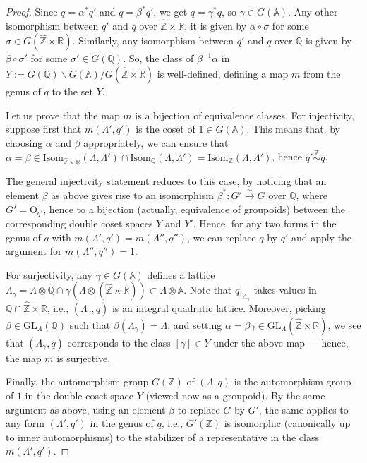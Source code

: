 \begin{proof}
	Since $q=\alpha^* q'$ and $q= \beta^* q'$, we get $q=\gamma^* q$, so $\gamma\in G(\mathbb{A})$. Any other isomorphism between $q'$ and $q$ over $\hat{\mathbb{Z}}\times \mathbb{R}$, it is given by $\alpha\circ \sigma$ for some $\sigma\in G(\hat{\mathbb{Z}}\times\mathbb{R})$. Similarly, any isomorphism between $q'$ and $q$ over $\mathbb{Q}$ is given by $\beta\circ \sigma'$ for some $\sigma'\in G(\mathbb{Q})$. So, the class of $\beta^{-1}\alpha$ in $Y:=G(\mathbb{Q})\backslash G(\mathbb{A})/G(\hat{\mathbb{Z}}\times \mathbb{R})$ is well-defined, defining a map $m$ from the genus of $q$ to the set $Y$.

    Let us prove that the map $m$ is a bijection of equivalence classes. For injectivity, suppose first that $m(\Lambda',q')$ is the coset of $1 \in G(\mathbb A)$. This means that, by choosing $\alpha$ and $\beta$ appropriately, we can ensure that $\alpha = \beta \in \text{Isom}_{\hat{\mathbb{Z}}\times\mathbb{R}} (\Lambda, \Lambda') \cap \text{Isom}_{\mathbb Q} (\Lambda, \Lambda') = \text{Isom}_{\mathbb{Z}}(\Lambda, \Lambda')$, hence $q' \overset{\mathbb Z}\sim q$. 
        
    The general injectivity statement reduces to this case, by noticing that an element $\beta$ as above gives rise to an isomorphism $\beta^*: G' \xrightarrow\sim G$ over $\mathbb Q$, where $G' = \text{O}_{q'}$, hence to a bijection (actually, equivalence of groupoids) between the corresponding double coset spaces $Y$ and $Y'$. Hence, for any two forms in the genus of $q$ with $m(\Lambda',q') = m(\Lambda'',q'')$, we can replace $q$ by $q'$ and apply the argument for $m(\Lambda'',q'')=1$.
	
    For surjectivity, any $\gamma \in G(\mathbb{A})$ defines a lattice $\Lambda_{\gamma}=\Lambda \otimes \mathbb{Q} \cap \gamma(\Lambda \otimes(\hat{\mathbb{Z}}\times \mathbb{R})) \subset \Lambda \otimes \mathbb{A}$. Note that $q|_{\Lambda_\gamma}$ takes values in $\mathbb Q\cap \hat{\mathbb{Z}}\times \mathbb{R}$, i.e., $(\Lambda_\gamma,q)$ is an integral quadratic lattice. Moreover, picking $\beta \in \text{GL}_{\Lambda}(\mathbb{Q})$ such that $\beta(\Lambda_\gamma)=\Lambda$, and setting $\alpha= \beta \gamma\in \text{GL}_{\Lambda}(\hat{\mathbb{Z}}\times \mathbb{R})$, we see that $(\Lambda_\gamma,q)$ corresponds to the class $[\gamma]\in Y$ under the above map --- hence, the map $m$ is surjective. 
	
	Finally, the automorphism group $G(\mathbb Z)$ of $(\Lambda,q)$ is the automorphism group of $1$ in the double coset space $Y$ (viewed now as a groupoid). By the same argument as above, using an element $\beta$ to replace $G$ by $G'$, the same applies to any form $(\Lambda',q')$ in the genus of $q$, i.e., $G'(\mathbb Z)$ is isomorphic (canonically up to inner automorphisms) to the stabilizer of a representative in the class $m(\Lambda',q')$.
\end{proof}



